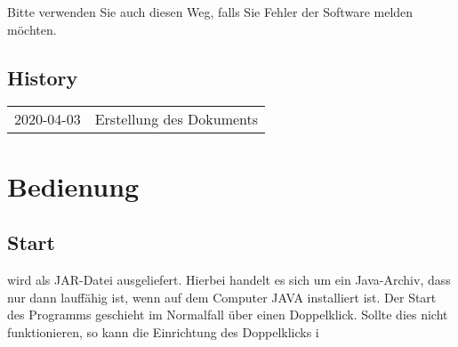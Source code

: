\documentclass[12pt]{scrartcl}
\begin{document}
Bitte verwenden Sie auch diesen Weg, falls Sie Fehler der Software melden möchten.\\

\subsection{History}
\begin{tabular}{p{4cm}p{10cm}}
2020-04-03 & Erstellung des Dokuments\\
\end{tabular}

\section{Bedienung}

\subsection{Start}
\lsN{} wird als JAR-Datei ausgeliefert. Hierbei handelt es sich um ein Java-Archiv, dass nur dann lauffähig ist, wenn auf dem Computer JAVA installiert ist. Der Start des Programms geschieht im Normalfall über einen Doppelklick. Sollte dies nicht funktionieren, so kann die Einrichtung des Doppelklicks i
\end{document}
